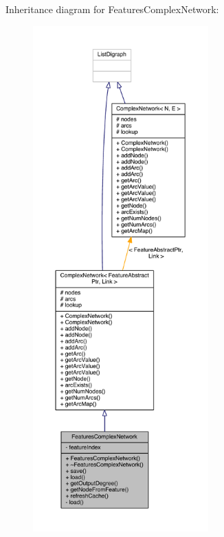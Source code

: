 Inheritance diagram for Features\+Complex\+Network\+:
\nopagebreak
\begin{figure}[H]
\begin{center}
\leavevmode
\includegraphics[height=550pt]{class_features_complex_network__inherit__graph}
\end{center}
\end{figure}


